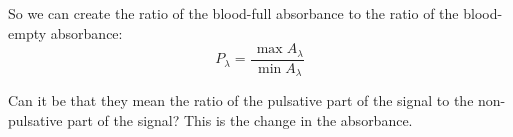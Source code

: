 \documentclass[11pt]{article}
\renewcommand{\min}{\expandafter\,\operatorname*{min}}
\renewcommand{\max}{\expandafter\,\operatorname*{max}}
\begin{document}
So we can create the ratio of the blood-full absorbance
to the ratio of the blood-empty absorbance:
\begin{equation}
  P_{\lambda} = \frac{\max{A_{\lambda}}}
  {\min{A_{\lambda}}}
\end{equation}




Can it be that they mean the ratio of the pulsative part of the signal
to the non-pulsative part of the signal?  This is the change in
the absorbance.










\end{document}

